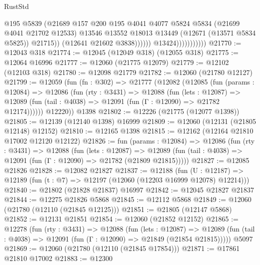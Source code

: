 \begin{lexlean}{RustStd}
\begin{coremodule}
                                      @195
                                      @5839
                                      (@21689
                                        @157
                                        @200
                                        @195
                                        @4041
                                        @4077
                                        @5824
                                        @5834
                                        (@21699 @4041 @21702 @12533)
                                        @13546
                                        @13552
                                        @18013
                                        @13449
                                        (@12671 (@13571 @5834 @5825))
                                        @21715))
                                    (@12641 @21602 @3838))))))
                          @13424)))))))))))
@21770 := @12043 @318
@21774 := @12045 (@12049 @318) (@12055 @318)
@21775 := @12064 @16996
@21777 := @12060 (@21775 @12079)
@21779 := @12102 (@12103 @318)
@21780 := @12098 @21779
@21782 := @12060 (@21780 @12127)
@21799 := @12059
    (fun (fn : @302) =>
    @21777
      (@12082
        (@12085
          (fun (params : @12084) =>
          @12086
            (fun (rty : @3431) =>
            @12088
              (fun (lets : @12087) =>
              @12089 (fun (tail : @4038) => @12091 (fun (Γ : @12090) => @21782 @12174))))))
        @12220))
    @1398
@21802 := @12226 (@21775 (@12077 @1398))
@21805 := @12139 (@12140 @1398) @16999
@21809 := @12060 (@12131 (@21805 @12148) @12152)
@21810 := @12165 @1398
@21815 := @12162 (@12164 @21810 @17002 @12120 @12122)
@21826 := fun (params : @12084) =>
  @12086
    (fun (rty : @3431) =>
    @12088
      (fun (lets : @12087) =>
      @12089 (fun (tail : @4038) => @12091 (fun (Γ : @12090) => @21782 (@21809 @21815)))))
@21827 := @12085 @21826
@21828 := @12082 @21827
@21837 := @12188
    (fun (U : @12187) => @12189 (fun (t : @7) => @12197 (@12060 (@12203 @16999 @12078) @12214)))
@21840 := @21802 (@21828 @21837) @16997
@21842 := @12045 @21827 @21837
@21844 := @12275 @21826 @5868
@21845 := @12112 @5868
@21849 := @12060 (@21780 (@12110 (@21845 @12125)))
@21851 := @21805 (@12147 @5868)
@21852 := @12131 @21851
@21854 := @12060 (@21852 @12152)
@21865 := @12278
    (fun (rty : @3431) =>
    @12088
      (fun (lets : @12087) =>
      @12089 (fun (tail : @4038) => @12091 (fun (Γ : @12090) => @21849 (@21854 @21815)))))
    @5097
@21869 := @12060 (@21780 (@12110 (@21845 @17854)))
@21871 := @17861 @21810 @17002
@21883 := @12300

\end{coremodule}
\end{lexlean}
